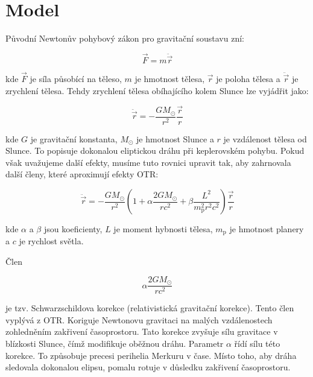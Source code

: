 \documentclass[a4paper,11pt,twocolumn]{article}
\begin{document}
    \section{Model}
        Původní Newtonův pohybový zákon pro gravitační soustavu zní:

        \begin{equation*}
            \vec{F} = m \ddot{\vec{r}} 
        \end{equation*}

        kde $\vec{F}$ je síla působící na těleso, $m$ je hmotnost tělesa, $\vec{r}$ je poloha tělesa a $\ddot{\vec{r}}$ je zrychlení tělesa. Tehdy zrychlení tělesa obíhajícího kolem Slunce lze vyjádřit jako:

        \begin{equation*}
            \ddot{\vec{r}} = -\frac{G M_{\odot}}{r^2} \frac{\vec{r}}{r}
        \end{equation*}

        kde $G$ je gravitační konstanta, $M_{\odot}$ je hmotnost Slunce a $r$ je vzdálenost tělesa od Slunce. To popisuje dokonalou eliptickou dráhu při keplerovském pohybu. Pokud však uvažujeme další efekty, musíme tuto rovnici upravit tak, aby zahrnovala další členy, které aproximují efekty OTR:

        \begin{equation}
            \ddot{\vec{r}} = -\frac{G M_{\odot}}{r^2} \left(1 + \alpha \frac{2 G M_{\odot}}{r c^2} + \beta \frac{L^2}{m_{\text{p}}^2 r^2 c^2}\right) \frac{\vec{r}}{r}
            \label{eq:motion_corr}
        \end{equation}

        kde $\alpha$ a $\beta$ jsou koeficienty, $L$ je moment hybnosti tělesa, $m_{\text{p}}$ je hmotnost planery a $c$ je rychlost světla. 

        Člen

        \begin{equation*}
            \alpha \frac{2 G M_{\odot}}{r c^2}
        \end{equation*}

        je tzv. Schwarzschildova korekce (relativistická gravitační korekce). Tento člen vyplývá z OTR. Koriguje Newtonovu gravitaci na malých vzdálenostech zohledněním zakřivení časoprostoru. Tato korekce zvyšuje sílu gravitace v blízkosti Slunce, čímž modifikuje oběžnou dráhu. Parametr $\alpha$ řídí sílu této korekce. To způsobuje precesi perihelia Merkuru v čase. Místo toho, aby dráha sledovala dokonalou elipsu, pomalu rotuje v důsledku zakřivení časoprostoru.
\end{document}
